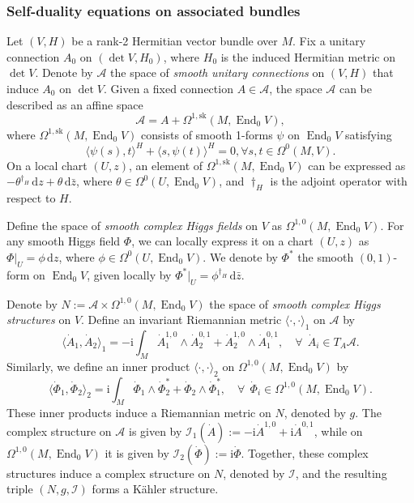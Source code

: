 \documentclass[a4paper]{amsart}
\theoremstyle{definition}
\theoremstyle{remark}
\numberwithin{equation}{section}
\begin{document}
\subsubsection{Self-duality equations on associated bundles}
Let $(V, H)$ be a rank-2 Hermitian vector bundle over $M$. Fix a unitary connection $A_0$ on $(\det V, H_0)$, where $H_0$ is the induced Hermitian metric on $\det V$. Denote by $\mathscr{A}$ the space of \textit{smooth unitary connections} on $(V, H)$ that induce $A_0$ on $\det V$. Given a fixed connection $A \in \mathscr{A}$, the space $\mathscr{A}$ can be described as an affine space 
\[
\mathscr{A} = A + \Omega^{1, \text{sk}}(M, \operatorname{End}_0 V),
\]
where $\Omega^{1, \text{sk}}(M, \operatorname{End}_0 V)$ consists of smooth 1-forms $\psi$ on $\operatorname{End}_0 V$ satisfying
\[
\langle \psi(s), t \rangle^{H} + \langle s, \psi(t) \rangle^{H} = 0,  \forall s, t \in \Omega^0(M, V).
\] 
On a local chart $(U, z)$, an element of $\Omega^{1, \text{sk}}(M, \operatorname{End}_0 V)$ can be expressed as
$-\theta^{\dagger_H} \, \mathrm{d}z + \theta \, \mathrm{d}\bar{z}$,
where $\theta \in \Omega^0(U, \operatorname{End}_0 V)$, and $\dagger_H$ is the adjoint operator with respect to $H$.

Define the space of \textit{smooth complex Higgs fields} on $V$ as $\Omega^{1,0}(M, \operatorname{End}_0 V)$. For any smooth Higgs field $\Phi$, we can locally express it on a chart $(U, z)$ as $\Phi|_U = \phi \, \mathrm{d}z$, where $\phi \in \Omega^0(U, \operatorname{End}_0 V)$. We denote by $\Phi^*$ the smooth $(0,1)$-form on $\operatorname{End}_0 V$, given locally by $\Phi^*|_U = \phi^{\dagger_H} \, \mathrm{d}\bar{z}$.

Denote by $N := \mathscr{A} \times \Omega^{1,0}(M, \operatorname{End}_0 V)$ the space of \textit{smooth complex Higgs structures} on $V$. Define an invariant Riemannian metric $\langle \cdot, \cdot \rangle_1$ on $\mathscr{A}$ by  
\[
\langle \dot{A}_1, \dot{A}_2 \rangle_1 = -\mathrm{i} \int_M \dot{A}_1^{1,0} \wedge \dot{A}_2^{0,1} + \dot{A}_2^{1,0} \wedge \dot{A}_1^{0,1}, \quad \forall~~ \dot{A}_i \in T_A \mathscr{A}.
\]  
Similarly, we define an inner product $\langle \cdot, \cdot \rangle_2$ on $\Omega^{1,0}(M, \operatorname{End}_0 V)$ by  
\[
\langle \dot{\Phi}_1, \dot{\Phi}_2 \rangle_2 = \mathrm{i} \int_M \dot{\Phi}_1 \wedge \dot{\Phi}_2^* + \dot{\Phi}_2 \wedge \dot{\Phi}_1^*, \quad \forall~~ \dot{\Phi}_i \in \Omega^{1,0}(M, \operatorname{End}_0 V).
\]  
These inner products induce a Riemannian metric on $N$, denoted by $g$. 
The complex structure on $\mathscr{A}$ is given by $\mathcal{I}_1(\dot{A}) := -\mathrm{i} \dot{A}^{1,0} + \mathrm{i} \dot{A}^{0,1}$, while on $\Omega^{1,0}(M, \operatorname{End}_0 V)$ it is given by $\mathcal{I}_2(\dot{\Phi}) := \mathrm{i} \dot{\Phi}$. Together, these complex structures induce a complex structure on $N$, denoted by $\mathcal{I}$, and the resulting triple $(N, g, \mathcal{I})$ forms a Kähler structure. 
\end{document}
